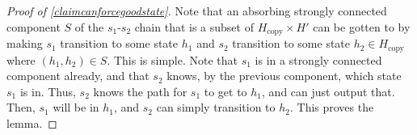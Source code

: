 \documentclass[11pt]{amsart}
\theoremstyle{definition}
\newtheorem{claim}[theorem]{Claim}
\theoremstyle{remark}
\begin{document}
      \begin{proof}[Proof of \cref{claimcanforcegoodstate}]
        Note that an absorbing strongly connected component $S$ of the $s_1$-$s_2$ chain that is a subset of $H_\text{copy} \times H'$ can be gotten to by making $s_1$ transition to some state $h_1$ and $s_2$ transition to some state $h_2 \in H_\text{copy}$ where $(h_1, h_2) \in S$. This is simple. Note that $s_1$ is in a strongly connected component already, and that $s_2$ knows, by the previous component, which state $s_1$ is in. Thus, $s_2$ knows the path for $s_1$ to get to $h_1$, and can just output that. Then, $s_1$ will be in $h_1$, and $s_2$ can simply transition to $h_2$. This proves the lemma.
      \end{proof}



      
\end{document}
